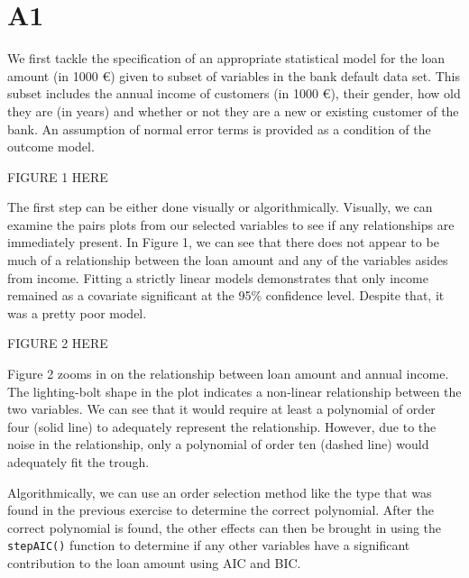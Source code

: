 
\section{A1} 


We first tackle the specification of an appropriate statistical model for the loan amount (in 1000 €) given to subset of variables in the bank default data set. This subset includes the annual income of customers (in 1000 €), their gender, how old they are (in years) and whether or not they are a new or existing customer of the bank. An assumption of normal error terms is provided as a condition of the outcome model. 

FIGURE 1 HERE

The first step can be either done visually or algorithmically. Visually, we can examine the pairs plots from our selected variables to see if any relationships are immediately present. In Figure 1, we can see that there does not appear to be much of a relationship between the loan amount and any of the variables asides from income. Fitting a strictly linear models demonstrates that only income remained as a covariate significant at the 95\% confidence level. Despite that, it was a pretty poor model.

FIGURE 2 HERE

Figure 2 zooms in on the relationship between loan amount and annual income. The lighting-bolt shape in the plot indicates a non-linear relationship between the two variables. We can see that it would require at least a polynomial of order four (solid line) to adequately represent the relationship. However, due to the  noise in the relationship, only a polynomial of order ten (dashed line) would adequately fit the trough. 

Algorithmically, we can use an order selection method like the type that was found in the previous exercise to determine the correct polynomial. After the correct polynomial is found, the other effects can then be brought in using the \lstinline{stepAIC()} function to determine if any other variables have a significant contribution to the loan amount using AIC and BIC. 

